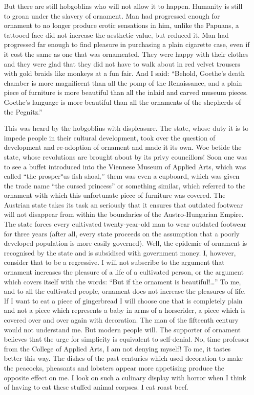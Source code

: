 \documentclass[a4paper]{article}
\begin{document}
But there are still hobgoblins who will not allow it to happen. Humanity is still to groan under the slavery of ornament. Man had progressed enough for ornament to no longer produce erotic sensations in him, unlike the Papuans, a tattooed face did not increase the aesthetic value, but reduced it. Man had progressed far enough to find pleasure in purchasing a plain cigarette case, even if it cost the same as one that was ornamented. They were happy with their clothes and they were glad that they did not have to walk about in red velvet trousers with gold braids like monkeys at a fun fair. And I said: “Behold, Goethe’s death chamber is more magnificent than all the pomp of the Renaissance, and a plain piece of furniture is more beautiful than all the inlaid and carved museum pieces. Goethe’s language is more beautiful than all the ornaments of the shepherds of the Pegnitz.”

This was heard by the hobgoblins with displeasure. The state, whose duty it is to impede people in their cultural development, took over the question of development and re-adoption of ornament and made it its own. Woe betide the state, whose revolutions are brought about by its privy councillors!
Soon one was to see a buffet introduced into the Viennese Museum of Applied Arts, which was called “the prosper°us fish shoal,” them was even a cupboard, which was given the trade name “the cursed princess” or something similar, which referred to the ornament with which this unfortunate piece of furniture was covered. The Austrian state takes its task an seriously that it ensures that outdated footwear will not disappear from within the boundaries of the Austro-Hungarian Empire. The state forces every cultivated twenty-year-old man to wear outdated footwear for three years (after all, every state proceeds on the assumption that a poorly developed population is more easily governed). Well, the epidemic of ornament is recognised by the state and is subsidised with government money. I, however, consider that to be a regressive. I will not subscribe to the argument that ornament increases the pleasure of a life of a cultivated person, or the argument which covers itself with the words: “But if the ornament is beautiful!…” To me, and to all the cultivated people, ornament does not increase the pleasures of life. If I want to eat a piece of gingerbread I will choose one that is completely plain and not a piece which represents a baby in arms of a horserider, a piece which is covered over and over again with decoration. The man of the fifteenth century would not understand me. But modern people will. The supporter of ornament believes that the urge for simplicity is equivalent to self-denial. No, time professor from the College of Applied Arts, I am not denying myself! To me, it tastes better this way. The dishes of the past centuries which used decoration to make the peacocks, pheasants and lobsters appear more appetising produce the opposite effect on me. I look on such a culinary display with horror when I think of having to eat these stuffed animal corpses. I eat roast beef.
\end{document}

